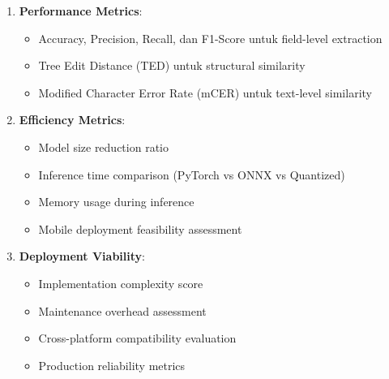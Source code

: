 \begin{enumerate}
    \item \textbf{Performance Metrics}:
    \begin{itemize}
        \item Accuracy, Precision, Recall, dan F1-Score untuk field-level extraction
        \item Tree Edit Distance (TED) untuk structural similarity
        \item Modified Character Error Rate (mCER) untuk text-level similarity
    \end{itemize}
    
    \item \textbf{Efficiency Metrics}:
    \begin{itemize}
        \item Model size reduction ratio
        \item Inference time comparison (PyTorch vs ONNX vs Quantized)
        \item Memory usage during inference
        \item Mobile deployment feasibility assessment
    \end{itemize}
    
    \item \textbf{Deployment Viability}:
    \begin{itemize}
        \item Implementation complexity score
        \item Maintenance overhead assessment  
        \item Cross-platform compatibility evaluation
        \item Production reliability metrics
    \end{itemize}
\end{enumerate}